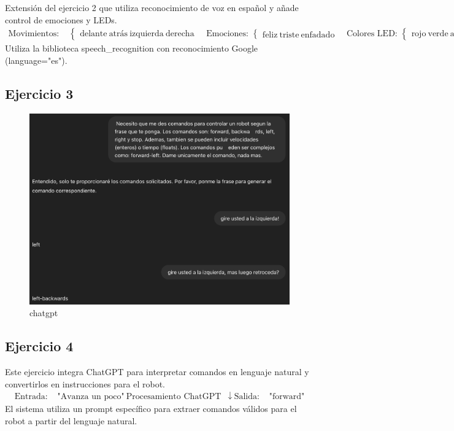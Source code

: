\documentclass{article}
\begin{document}
Extensión del ejercicio 2 que utiliza reconocimiento de voz en español y añade control de emociones y LEDs.
$$\begin{align}
\text{Movimientos: } &\begin{cases}
\text{delante} \
\text{atrás} \
\text{izquierda} \
\text{derecha}
\end{cases} \quad
\text{Emociones: } \begin{cases}
\text{feliz} \
\text{triste} \
\text{enfadado}
\end{cases} \quad
\text{Colores LED: } \begin{cases}
\text{rojo} \
\text{verde} \
\text{azul}
\end{cases}
\end{align}$$
Utiliza la biblioteca speech\_recognition con reconocimiento Google (language="es").

\subsection*{Ejercicio 3}

\begin{figure}[h]
	\centering
	\includegraphics[width=0.7\linewidth]{captura}
	\caption{chatgpt}
	\label{fig:captura}
\end{figure}


\subsection*{Ejercicio 4}

Este ejercicio integra ChatGPT para interpretar comandos en lenguaje natural y convertirlos en instrucciones para el robot.
$$\begin{aligned}
	\text{Entrada:} &\text{ "Avanza un poco"} \
	\text{Procesamiento ChatGPT} &\downarrow \
	\text{Salida:} &\text{ "forward"}
\end{aligned}$$
El sistema utiliza un prompt específico para extraer comandos válidos para el robot a partir del lenguaje natural.
\end{document}
